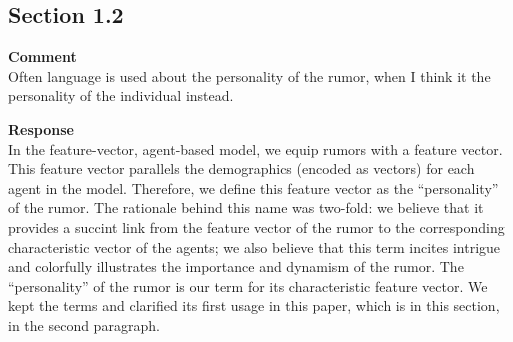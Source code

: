 \subsection{Section 1.2}
\setcounter{rev2-1.2}{1}

\textbf{Comment } \\
Often language is used about the personality of the rumor, when I think it the personality of the individual instead.

\textbf{Response } \\
In the feature-vector, agent-based model, we equip rumors with a feature vector.
This feature vector parallels the demographics (encoded as vectors) for each agent in the model.
Therefore, we define this feature vector as the ``personality'' of the rumor.
The rationale behind this name was two-fold: we believe that it provides a succint link from the feature vector of the rumor to the corresponding characteristic vector of the agents; we also believe that this term incites intrigue and colorfully illustrates the importance and dynamism of the rumor.
The ``personality'' of the rumor is our term for its characteristic feature vector.
We kept the terms and clarified its first usage in this paper, which is in this section, in the second paragraph.
